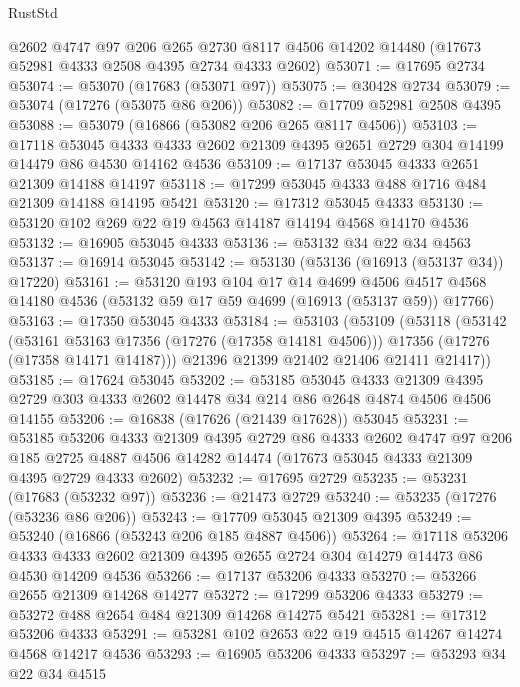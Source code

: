\begin{lexlean}{RustStd}
\begin{coremodule}
    @2602
    @4747
    @97
    @206
    @265
    @2730
    @8117
    @4506
    @14202
    @14480
    (@17673 @52981 @4333 @2508 @4395 @2734 @4333 @2602)
@53071 := @17695 @2734
@53074 := @53070 (@17683 (@53071 @97))
@53075 := @30428 @2734
@53079 := @53074 (@17276 (@53075 @86 @206))
@53082 := @17709 @52981 @2508 @4395
@53088 := @53079 (@16866 (@53082 @206 @265 @8117 @4506))
@53103 := @17118
    @53045
    @4333
    @4333
    @2602
    @21309
    @4395
    @2651
    @2729
    @304
    @14199
    @14479
    @86
    @4530
    @14162
    @4536
@53109 := @17137 @53045 @4333 @2651 @21309 @14188 @14197
@53118 := @17299 @53045 @4333 @488 @1716 @484 @21309 @14188 @14195 @5421
@53120 := @17312 @53045 @4333
@53130 := @53120 @102 @269 @22 @19 @4563 @14187 @14194 @4568 @14170 @4536
@53132 := @16905 @53045 @4333
@53136 := @53132 @34 @22 @34 @4563
@53137 := @16914 @53045
@53142 := @53130 (@53136 (@16913 (@53137 @34)) @17220)
@53161 := @53120
    @193
    @104
    @17
    @14
    @4699
    @4506
    @4517
    @4568
    @14180
    @4536
    (@53132 @59 @17 @59 @4699 (@16913 (@53137 @59)) @17766)
@53163 := @17350 @53045 @4333
@53184 := @53103
    (@53109
      (@53118
        (@53142
          (@53161 @53163 @17356 (@17276 (@17358 @14181 @4506)))
          @17356
          (@17276 (@17358 @14171 @14187)))
        @21396
        @21399
        @21402
        @21406
        @21411
        @21417))
@53185 := @17624 @53045
@53202 := @53185
    @53045
    @4333
    @21309
    @4395
    @2729
    @303
    @4333
    @2602
    @14478
    @34
    @214
    @86
    @2648
    @4874
    @4506
    @4506
    @14155
@53206 := @16838 (@17626 (@21439 @17628)) @53045
@53231 := @53185
    @53206
    @4333
    @21309
    @4395
    @2729
    @86
    @4333
    @2602
    @4747
    @97
    @206
    @185
    @2725
    @4887
    @4506
    @14282
    @14474
    (@17673 @53045 @4333 @21309 @4395 @2729 @4333 @2602)
@53232 := @17695 @2729
@53235 := @53231 (@17683 (@53232 @97))
@53236 := @21473 @2729
@53240 := @53235 (@17276 (@53236 @86 @206))
@53243 := @17709 @53045 @21309 @4395
@53249 := @53240 (@16866 (@53243 @206 @185 @4887 @4506))
@53264 := @17118
    @53206
    @4333
    @4333
    @2602
    @21309
    @4395
    @2655
    @2724
    @304
    @14279
    @14473
    @86
    @4530
    @14209
    @4536
@53266 := @17137 @53206 @4333
@53270 := @53266 @2655 @21309 @14268 @14277
@53272 := @17299 @53206 @4333
@53279 := @53272 @488 @2654 @484 @21309 @14268 @14275 @5421
@53281 := @17312 @53206 @4333
@53291 := @53281 @102 @2653 @22 @19 @4515 @14267 @14274 @4568 @14217 @4536
@53293 := @16905 @53206 @4333
@53297 := @53293 @34 @22 @34 @4515

\end{coremodule}
\end{lexlean}

